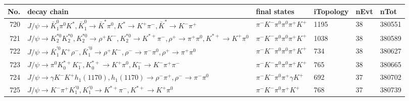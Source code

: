 \begin{table}[htbp] 
\begin{center}
\begin{small}
\begin{tabular}{rlllll}\hline\hline
 No. & decay chain & final states &  iTopology & nEvt & nTot \\\hline
720&$J/\psi       \rightarrow \bar{K}_1^{0} \pi^{0}        K^{*}          , \bar{K}_1^{0}  \rightarrow \bar{K}^{*}   \pi^{0}        , K^{*}           \rightarrow K^{+}          \pi^{-}        , \bar{K}^{*}    \rightarrow K^{-}          \pi^{+}        $&$\pi^{-}        K^{-}          \pi^{0}        \pi^{0}        \pi^{+}        K^{+}          $& 1195&   38&380551\\
721&$J/\psi       \rightarrow K_2^{*0}       K_2^{*0}       , K_2^{*0}        \rightarrow \rho^{+}      K^{-}          , K_2^{*0}        \rightarrow K^{*+}         \pi^{-}        , \rho^{+}       \rightarrow \pi^{+}        \pi^{0}        , K^{*+}          \rightarrow K^{+}          \pi^{0}        $&$\pi^{-}        K^{-}          \pi^{0}        \pi^{0}        \pi^{+}        K^{+}          $& 1038&   38&380589\\
722&$J/\psi       \rightarrow \bar{K}_1^{'0}K^{+}          \rho^{-}      , \bar{K}_1^{'0} \rightarrow \rho^{+}      K^{-}          , \rho^{-}       \rightarrow \pi^{-}        \pi^{0}        , \rho^{+}       \rightarrow \pi^{+}        \pi^{0}        $&$\pi^{-}        K^{-}          \pi^{0}        \pi^{0}        \pi^{+}        K^{+}          $&  734&   38&380627\\
723&$J/\psi       \rightarrow \pi^{0}        K_{0}^{*+}     K_{1}^{-}      , K_{0}^{*+}      \rightarrow K^{+}          \pi^{0}        , K_{1}^{-}       \rightarrow K^{-}          \pi^{+}        \pi^{-}        $&$\pi^{-}        K^{-}          \pi^{0}        \pi^{0}        \pi^{+}        K^{+}          $&  765&   38&380665\\
724&$J/\psi       \rightarrow \gamma       K^{-}          K^{+}          h_{1}(1170)    , h_{1}(1170)     \rightarrow \rho^{-}      \pi^{+}        , \rho^{-}       \rightarrow \pi^{-}        \pi^{0}        $&$\pi^{-}        K^{-}          \pi^{0}        \pi^{+}        \gamma       K^{+}          $&  692&   37&380702\\
725&$J/\psi       \rightarrow K^{-}          \pi^{+}        K_1^{'0}      , K_1^{'0}       \rightarrow K^{*+}         \pi^{-}        , K^{*+}          \rightarrow K^{+}          \pi^{0}        $&$\pi^{-}        K^{-}          \pi^{0}        \pi^{+}        K^{+}          $&  768&   37&380739\\

\end{tabular}
\end{small}
\end{center}
\end{table}
